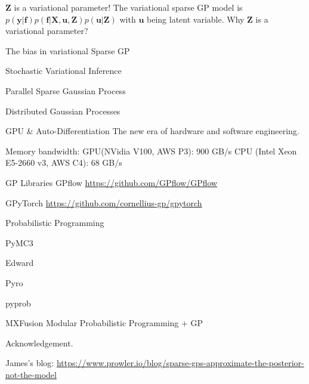 \documentclass[14pt,aspectratio=1610]{beamer}
\newcommand{\yV}{\mathbf{y}}
\newcommand{\fV}{\mathbf{f}}
\newcommand{\xM}{\mathbf{X}}
\newcommand{\uV}{\mathbf{u}}
\newcommand{\zM}{\mathbf{Z}}
\begin{document}
\begin{frame}{$\zM$ is a variational parameter!}
The variational sparse GP model is $p(\yV|\fV) p(\fV|\xM, \uV, \zM) p(\uV| \zM)$ with $\uV$ being latent variable. Why $\zM$ is a variational parameter?
\end{frame}

\begin{frame}{The bias in variational Sparse GP}
\end{frame}

\begin{frame}{Stochastic Variational Inference}
\end{frame}

\begin{frame}{Parallel Sparse Gaussian Process}
\end{frame}

\begin{frame}{Distributed Gaussian Processes}
\end{frame}

\begin{frame}{GPU \& Auto-Differentiation}
The new era of hardware and software engineering.

Memory bandwidth:
GPU(NVidia V100, AWS P3): 900 GB/s
CPU (Intel Xeon E5-2660 v3, AWS C4): 68 GB/s
\end{frame}

\begin{frame}{GP Libraries}
GPflow \url{https://github.com/GPflow/GPflow}

GPyTorch \url{https://github.com/cornellius-gp/gpytorch}
\end{frame}

\begin{frame}{Probabilistic Programming}

PyMC3

Edward

Pyro

pyprob
\end{frame}

\begin{frame}{MXFusion}
Modular Probabilistic Programming + GP
\end{frame}

\begin{frame}{}

Acknowledgement. 

James's blog: \url{https://www.prowler.io/blog/sparse-gps-approximate-the-posterior-not-the-model}
\end{frame}


{\footnotesize

}
%
\end{document}
